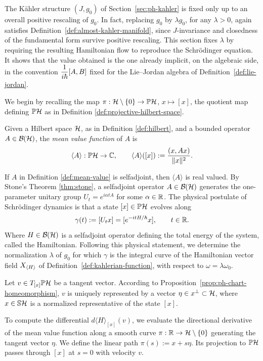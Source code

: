 The Kähler structure $(J,g_0)$ of Section~\ref{sec:ph-kahler} is fixed only up to an overall positive rescaling of $g_0$. In fact, replacing $g_0$ by $\lambda g_0$, for any $\lambda>0$, again satisfies Definition~\ref{def:almost-kahler-manifold}, since $J$-invariance and closedness of the fundamental form survive positive rescaling. This section fixes $\lambda$ by requiring the resulting Hamiltonian flow to reproduce the Schrödinger equation. It shows that the value obtained is the one already implicit, on the algebraic side, in the convention $\dfrac{1}{i\hbar}[A,B]$ fixed for the Lie--Jordan algebra of Definition~\ref{def:lie-jordan}.

\noindent We begin by recalling the map $\pi:\H\setminus\{0\}\to\PH$, $x\mapsto[x]$, the quotient map defining $\PH$ as in Definition \ref{def:projective-hilbert-space}.

\begin{definition}
	\label{def:mean-value}
	Given a Hilbert space $\H$, as in Definition \ref{def:hilbert}, and a bounded operator $A\in\BH$, the \emph{mean value function} of $A$ is
	\[
	\langle A\rangle : \PH \to \C, \qquad
	\langle A\rangle([x]) := \frac{(x,Ax)}{\|x\|^2}.
	\]
\end{definition}

\noindent If $A$ in Definition \ref{def:mean-value} is selfadjoint, then $\langle A\rangle$ is real valued. By Stone's Theorem \ref{thm:stone}, a selfadjoint operator $A\in\BH$ generates the one-parameter unitary group $U_t=e^{i \alpha t A}$ for some $\alpha \in \mathbb{R}$. The physical
postulate of Schrödinger dynamics is that a state $[x]\in\PH$ evolves
along
\[
	\gamma(t):=[U_tx]=[e^{-itH/\hbar}x], \qquad t\in\mathbb{R}.
\]
Where $H \in \BH$ is a selfadjoint operator defining the total energy of the system, called the Hamiltonian. Following this physical statement, we determine the normalization $\lambda$ of $g_0$ for which $\gamma$ is the integral curve of the Hamiltonian vector field $X_{\langle H\rangle}$ of Definition~\ref{def:kahlerian-function}, with respect to
$\omega=\lambda\omega_0$.

\noindent Let $v\in T_{[x]}\PH$ be a tangent vector. According to Proposition~\ref{prop:ph-chart-homeomorphism}, $v$ is uniquely represented by a vector $\eta \in x^\perp \subset \H$, where $x \in \mathbb{S}\H$ is a normalized representative of the state $[x]$.

\noindent To compute the differential $d\langle H\rangle_{[x]}(v)$, we evaluate the directional derivative of the mean value function along a smooth curve $\pi: \R \to \H\setminus\{0\}$ generating the tangent vector $\eta$. We define the linear path $\pi(s) := x + s\eta$. Its projection to $\PH$ passes through $[x]$ at $s=0$ with velocity $v$.

